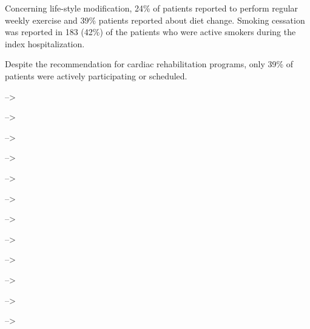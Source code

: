 \documentclass[
]{article}
\begin{document}
Concerning life-style modification, 24\% of patients reported to perform
regular weekly exercise and 39\% patients reported about diet change.
Smoking cessation was reported in 183 (42\%) of the patients who were
active smokers during the index hospitalization.

Despite the recommendation for cardiac rehabilitation programs, only
39\% of patients were actively participating or scheduled. \pagebreak

--\textgreater{}

--\textgreater{}

--\textgreater{}

--\textgreater{}

--\textgreater{}

--\textgreater{}

--\textgreater{}

--\textgreater{}

--\textgreater{}

--\textgreater{}

--\textgreater{}

--\textgreater{}
\end{document}

